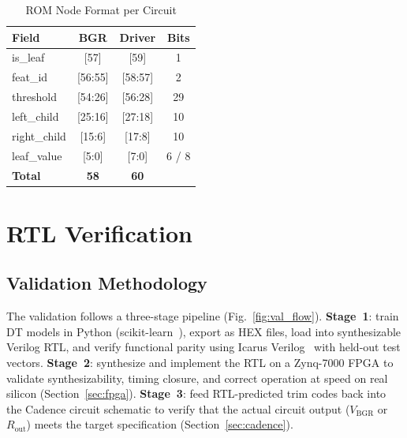 \documentclass[lettersize,journal]{IEEEtran}
\begin{document}
\begin{table}[!t]
\caption{ROM Node Format per Circuit\label{tab:node_format}}
\centering
\begin{tabular}{lccc}
\toprule
\textbf{Field} & \textbf{BGR} & \textbf{Driver} & \textbf{Bits} \\
\midrule
is\_leaf & [57] & [59] & 1 \\
feat\_id & [56:55] & [58:57] & 2 \\
threshold & [54:26] & [56:28] & 29 \\
left\_child & [25:16] & [27:18] & 10 \\
right\_child & [15:6] & [17:8] & 10 \\
leaf\_value & [5:0] & [7:0] & 6 / 8 \\
\midrule
\textbf{Total} & \textbf{58} & \textbf{60} & \\
\bottomrule
\end{tabular}
\end{table}


\section{RTL Verification}

\subsection{Validation Methodology}
The validation follows a three-stage pipeline (Fig.~\ref{fig:val_flow}). \textbf{Stage~1}: train DT models in Python (scikit-learn~\cite{sklearn}), export as HEX files, load into synthesizable Verilog RTL, and verify functional parity using Icarus Verilog~\cite{icarus} with held-out test vectors. \textbf{Stage~2}: synthesize and implement the RTL on a Zynq-7000 FPGA to validate synthesizability, timing closure, and correct operation at speed on real silicon (Section~\ref{sec:fpga}). \textbf{Stage~3}: feed RTL-predicted trim codes back into the Cadence circuit schematic to verify that the actual circuit output ($V_{\text{BGR}}$ or $R_{\text{out}}$) meets the target specification (Section~\ref{sec:cadence}).

\end{document}
